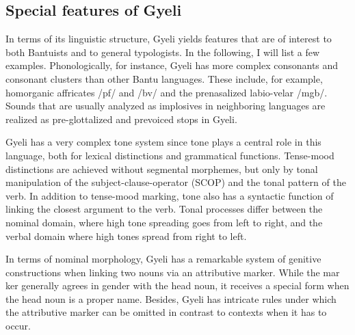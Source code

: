 
\subsection{Special features of Gyeli}


In terms of its linguistic structure, Gyeli yields features that are of interest to both Bantuists and to general typologists. In the following, I will list a few examples. 
Phonologically, for instance, Gyeli has more complex consonants and consonant clusters than other Bantu languages. These include, for example, homorganic affricates /pf/ and /bv/ and the prenasalized labio-velar /mgb/. Sounds that are usually analyzed as implosives in neighboring languages are realized as pre-glottalized and prevoiced stops in Gyeli.

Gyeli has a very complex tone system since tone plays a central role in this language, both for lexical distinctions and grammatical functions. Tense-mood distinctions are achieved without segmental morphemes, but only by tonal manipulation of  the subject-clause-operator (SCOP) and the tonal pattern of the verb. In addition to tense-mood marking, tone also has a syntactic function of linking the closest argument to the verb. Tonal processes differ between the nominal domain, where high tone spreading goes from left to right, and the verbal domain where high tones spread from right to left.

In terms of nominal morphology, Gyeli has a remarkable system of genitive constructions when linking two nouns via an attributive marker. While the mar\-   ker generally agrees in gender with the head noun, it receives a special form when the head noun is a proper name. Besides, Gyeli has intricate rules under which the attributive marker can be omitted in contrast to contexts when it has to occur.

